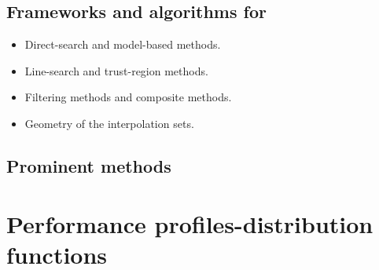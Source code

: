 \subsection{Frameworks and algorithms for }

\begin{itemize}
    \item Direct-search and model-based methods.
    \item Line-search and trust-region methods.
    \item Filtering methods and composite methods.
    \item Geometry of the interpolation sets.
\end{itemize}

\subsection{Prominent  methods}

\section{Performance profiles-distribution functions}
